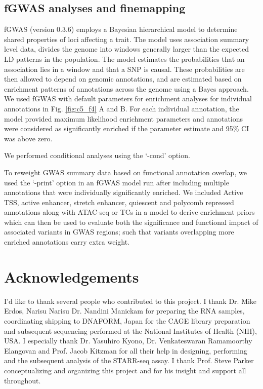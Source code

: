 \subsection{fGWAS analyses and finemapping}                                        
fGWAS (version 0.3.6) \cite{pickrellJointAnalysisFunctional2014} employs a Bayesian hierarchical model to determine shared properties of loci affecting a trait. The model uses association summary level data, divides the genome into windows generally larger than the expected LD patterns in the population. The model estimates the probabilities that an association lies in a window and that a SNP is causal. These probabilities are then allowed to depend on genomic annotations, and are estimated based on enrichment patterns of annotations across the genome using a Bayes approach. We used fGWAS with default parameters for enrichment analyses for individual annotations in Fig. \ref{fig:c5_f4} A and B. For each individual annotation, the model provided maximum likelihood enrichment parameters and annotations were considered as significantly enriched if the parameter estimate and 95\% CI was above zero. 


We performed conditional analyses using the ‘-cond’ option. 


To reweight GWAS summary data based on functional annotation overlap, we used the ‘-print’ option in an fGWAS model run after including multiple annotations that were individually significantly enriched. We included Active TSS, active enhancer, stretch enhancer, quiescent and polycomb repressed annotations along with ATAC-seq or TCs in a model to derive enrichment priors which can then be used to evaluate both the significance and functional impact of associated variants in GWAS regions; such that variants overlapping more enriched annotations carry extra weight. 
                        
\section{Acknowledgements}
I'd like to thank several people who contributed to this project. I thank Dr. Mike Erdos, Narisu Narisu Dr. Nandini Manickam for preparing the RNA samples, coordinating shipping to DNAFORM, Japan for the CAGE library preparation and subsequent sequencing performed at the National Institutes of Health (NIH), USA. I especially thank Dr. Yasuhiro Kyono, Dr. Venkateswaran Ramamoorthy Elangovan and Prof. Jacob Kitzman for all their help in designing, performing and the subsequent analysis of the STARR-seq assay. I thank Prof. Steve Parker conceptualizing and organizing this project and for his insight and support all throughout.